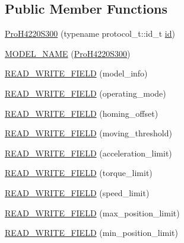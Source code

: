 \subsection*{Public Member Functions}
\begin{DoxyCompactItemize}
\item 
\hyperlink{classdynamixel_1_1servos_1_1_pro_h4220_s300_adc67078144dd29767d39d690a85ab011}{Pro\+H4220\+S300} (typename protocol\+\_\+t\+::id\+\_\+t \hyperlink{classdynamixel_1_1servos_1_1_servo_a2d022081672e25a7bb57b76706e1cc57}{id})
\item 
\hyperlink{classdynamixel_1_1servos_1_1_pro_h4220_s300_a6b8da72098c3c637e9b9d4b4270596fc}{M\+O\+D\+E\+L\+\_\+\+N\+A\+M\+E} (\hyperlink{classdynamixel_1_1servos_1_1_pro_h4220_s300}{Pro\+H4220\+S300})
\item 
\hyperlink{classdynamixel_1_1servos_1_1_pro_h4220_s300_a060c5877abd4e1bfb53fb8885a3d7430}{R\+E\+A\+D\+\_\+\+W\+R\+I\+T\+E\+\_\+\+F\+I\+E\+L\+D} (model\+\_\+info)
\item 
\hyperlink{classdynamixel_1_1servos_1_1_pro_h4220_s300_a06778fd4182a06e0c6aef4c2ce3f81e2}{R\+E\+A\+D\+\_\+\+W\+R\+I\+T\+E\+\_\+\+F\+I\+E\+L\+D} (operating\+\_\+mode)
\item 
\hyperlink{classdynamixel_1_1servos_1_1_pro_h4220_s300_a4c6a9477dee9296e1200af5963a82bbd}{R\+E\+A\+D\+\_\+\+W\+R\+I\+T\+E\+\_\+\+F\+I\+E\+L\+D} (homing\+\_\+offset)
\item 
\hyperlink{classdynamixel_1_1servos_1_1_pro_h4220_s300_ae0afe404295a6f2679629fec746d0724}{R\+E\+A\+D\+\_\+\+W\+R\+I\+T\+E\+\_\+\+F\+I\+E\+L\+D} (moving\+\_\+threshold)
\item 
\hyperlink{classdynamixel_1_1servos_1_1_pro_h4220_s300_a4ecdf974ff85f9de923d51a3b607ef40}{R\+E\+A\+D\+\_\+\+W\+R\+I\+T\+E\+\_\+\+F\+I\+E\+L\+D} (acceleration\+\_\+limit)
\item 
\hyperlink{classdynamixel_1_1servos_1_1_pro_h4220_s300_aef6c1baa0bc965f77e86bd296e4fe195}{R\+E\+A\+D\+\_\+\+W\+R\+I\+T\+E\+\_\+\+F\+I\+E\+L\+D} (torque\+\_\+limit)
\item 
\hyperlink{classdynamixel_1_1servos_1_1_pro_h4220_s300_a2c9d640120dca709fb9f09cb57f17a96}{R\+E\+A\+D\+\_\+\+W\+R\+I\+T\+E\+\_\+\+F\+I\+E\+L\+D} (speed\+\_\+limit)
\item 
\hyperlink{classdynamixel_1_1servos_1_1_pro_h4220_s300_af159fd2d3231af7d7bdfaee24344f1ac}{R\+E\+A\+D\+\_\+\+W\+R\+I\+T\+E\+\_\+\+F\+I\+E\+L\+D} (max\+\_\+position\+\_\+limit)
\item 
\hyperlink{classdynamixel_1_1servos_1_1_pro_h4220_s300_ac17cd6737808bd4f48c51f634ef8fd21}{R\+E\+A\+D\+\_\+\+W\+R\+I\+T\+E\+\_\+\+F\+I\+E\+L\+D} (min\+\_\+position\+\_\+limit)

\end{DoxyCompactItemize}
